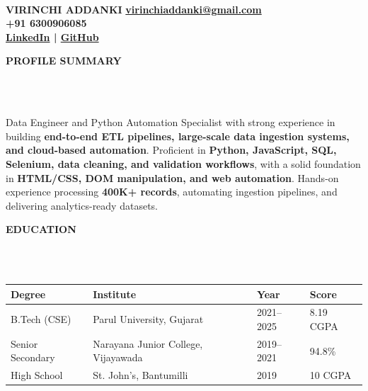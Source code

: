 \documentclass[a4paper,10pt]{article}
\newcommand{\lsep}{-0.5cm}
\newcommand{\resheading}[1]{{\small \colorbox{mygrey}{\begin{minipage}{0.975\textwidth}{\textbf{#1}}\end{minipage}}}}
\begin{document}
\hspace{0.5cm}\\[-1.8cm]

\textbf{VIRINCHI ADDANKI} \hspace{7.2cm} {\bf \href{mailto:virinchiaddanki@gmail.com}{virinchiaddanki@gmail.com}}\\
 \hspace{5.6cm} {\bf +91 6300906085} \\
 \hspace{8.5cm}
{\bf \href{https://www.linkedin.com/in/virinchi-addanki/}{LinkedIn} | \href{https://github.com/addanki-virinchi}{GitHub}} \\


\vspace{-2mm}

\resheading{\textbf{PROFILE SUMMARY}}\\[\lsep]\\

\hspace{0.11cm}
\begin{minipage}{0.98\textwidth}
Data Engineer and Python Automation Specialist with strong experience in building
\textbf{end-to-end ETL pipelines, large-scale data ingestion systems, and cloud-based automation}.
Proficient in \textbf{Python, JavaScript, SQL, Selenium, data cleaning, and validation workflows},
with a solid foundation in \textbf{HTML/CSS, DOM manipulation, and web automation}.
Hands-on experience processing \textbf{400K+ records}, automating ingestion pipelines,
and delivering analytics-ready datasets.
\end{minipage}

\vspace{4mm}


\resheading{\textbf{EDUCATION}}\\[\lsep]\\

\indent
\begin{tabular}{ p{3cm} @{\hskip 0.15in} p{6cm} @{\hskip 0.15in} p{4cm} @{\hskip 0.15in} p{2cm} }
\toprule
\textbf{Degree} & \textbf{Institute} & \textbf{Year} & \textbf{Score} \\
\midrule
B.Tech (CSE) & Parul University, Gujarat & 2021--2025 & 8.19 CGPA \\
Senior Secondary & Narayana Junior College, Vijayawada & 2019--2021 & 94.8\% \\
High School & St. John's, Bantumilli & 2019 & 10 CGPA \\
\bottomrule
\end{tabular}
\end{document}

